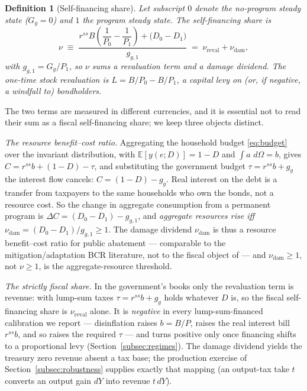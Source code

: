 \documentclass[12pt]{article}
\newtheorem{definition}{Definition}
\newcommand{\E}{\mathbb{E}}
\newcommand{\dd}{\,d}
\begin{document}
\begin{definition}[Self-financing share]\label{def:nu}
Let subscript $0$ denote the no-program steady state ($G_g=0$) and $1$ the
program steady state. The self-financing share is
\begin{equation}
\nu \;\equiv\; \frac{r^{ss}B\left(\dfrac{1}{P_0}-\dfrac{1}{P_1}\right)
+ \big(D_0 - D_1\big)}{g_{g,1}}
\;=\; \nu_{\mathrm{reval}} + \nu_{\mathrm{dam}},
\label{eq:nu}
\end{equation}
with $g_{g,1}=G_g/P_1$, so $\nu$ sums a \emph{revaluation} term and a
\emph{damage dividend}. The one-time stock revaluation is
$L = B/P_0 - B/P_1$, a capital levy on (or, if negative, a windfall to)
bondholders.
\end{definition}

The two terms are measured in different currencies, and it is essential not
to read their sum as a fiscal self-financing share; we keep three objects
distinct.

\emph{The resource benefit--cost ratio.} Aggregating the household budget
\eqref{eq:budget} over the invariant distribution, with $\E[y(e;D)]=1-D$
and $\int a\,\dd\Omega=b$, gives $C = r^{ss}b + (1-D) - \tau$, and
substituting the government budget $\tau=r^{ss}b+g_g$ the interest flow
cancels: $C = (1-D) - g_g$. Real interest on the debt is a transfer from
taxpayers to the same households who own the bonds, not a resource cost. So
the change in aggregate consumption from a permanent program is
$\Delta C = (D_0-D_1) - g_{g,1}$, and \emph{aggregate resources rise iff}
$\nu_{\mathrm{dam}}=(D_0-D_1)/g_{g,1}\ge1$. The damage dividend
$\nu_{\mathrm{dam}}$ is thus a resource benefit--cost ratio for public
abatement --- comparable to the mitigation/adaptation BCR literature, not to
the fiscal object of \citet{angeletos2024deficits} --- and $\nu_{\mathrm{dam}}\ge1$,
not $\nu\ge1$, is the aggregate-resource threshold.

\emph{The strictly fiscal share.} In the government's books only the
revaluation term is revenue: with lump-sum taxes $\tau=r^{ss}b+g_g$ holds
whatever $D$ is, so the fiscal self-financing share is $\nu_{\mathrm{reval}}$
alone. It is \emph{negative} in every lump-sum-financed calibration we report
--- disinflation raises $b=B/P$, raises the real interest bill $r^{ss}b$, and
so raises the required $\tau$ --- and turns positive only once financing
shifts to a proportional levy (Section~\ref{subsec:regimes}). The damage
dividend yields the treasury zero revenue absent a tax base; the production
exercise of Section~\ref{subsec:robustness} supplies exactly that mapping
(an output-tax take $t$ converts an output gain $dY$ into revenue $t\,dY$).
\end{document}
